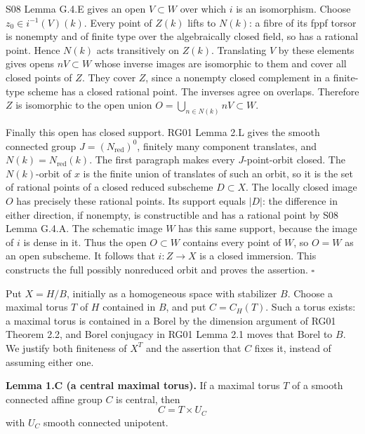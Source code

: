 \documentclass[11pt,a4paper,openany]{report}
\newcounter{none}
\begin{document}
S08 Lemma G.4.E gives an open \(V\subset W\) over which \(i\) is an isomorphism. Choose \(z_0\in i^{-1}(V)(k)\). Every point of \(Z(k)\) lifts to \(N(k)\): a fibre of its fppf torsor is nonempty and of finite type over the algebraically closed field, so has a rational point. Hence \(N(k)\) acts transitively on \(Z(k)\). Translating \(V\) by these elements gives opens \(nV\subset W\) whose inverse images are isomorphic to them and cover all closed points of \(Z\). They cover \(Z\), since a nonempty closed complement in a finite-type scheme has a closed rational point. The inverses agree on overlaps. Therefore \(Z\) is isomorphic to the open union \(O=\bigcup_{n\in N(k)}nV\subset W\).

Finally this open has closed support. RG01 Lemma 2.L gives the smooth connected group \(J=(N_{\mathrm{red}})^0\), finitely many component translates, and \(N(k)=N_{\mathrm{red}}(k)\). The first paragraph makes every \(J\)-point-orbit closed. The \(N(k)\)-orbit of \(x\) is the finite union of translates of such an orbit, so it is the set of rational points of a closed reduced subscheme \(D\subset X\). The locally closed image \(O\) has precisely these rational points. Its support equals \(|D|\): the difference in either direction, if nonempty, is constructible and has a rational point by S08 Lemma G.4.A. The schematic image \(W\) has this same support, because the image of \(i\) is dense in it. Thus the open \(O\subset W\) contains every point of \(W\), so \(O=W\) as an open subscheme. It follows that \(i:Z\to X\) is a closed immersion. This constructs the full possibly nonreduced orbit and proves the assertion. \(\square\)

Put \(X=H/B\), initially as a homogeneous space with stabilizer \(B\). Choose a maximal torus \(T\) of \(H\) contained in \(B\), and put \(C=C_H(T)\). Such a torus exists: a maximal torus is contained in a Borel by the dimension argument of RG01 Theorem 2.2, and Borel conjugacy in RG01 Lemma 2.1 moves that Borel to \(B\). We justify both finiteness of \(X^T\) and the assertion that \(C\) fixes it, instead of assuming either one.

\textbf{Lemma 1.C (a central maximal torus).} If a maximal torus \(T\) of a smooth connected affine group \(C\) is central, then \[
 C=T\times U_C
\] with \(U_C\) smooth connected unipotent.
\end{document}
